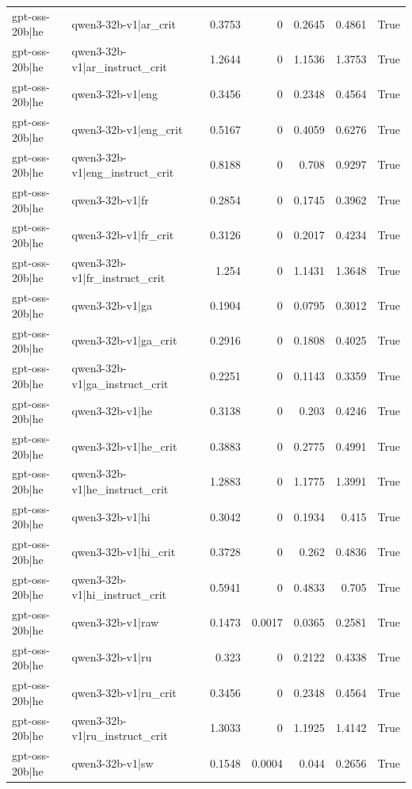 \begin{table}
\begin{tabular}{l l r r r r l}
gpt-oss-20b|he & qwen3-32b-v1|ar_crit & 0.3753 & 0 & 0.2645 & 0.4861 & True \\
gpt-oss-20b|he & qwen3-32b-v1|ar_instruct_crit & 1.2644 & 0 & 1.1536 & 1.3753 & True \\
gpt-oss-20b|he & qwen3-32b-v1|eng & 0.3456 & 0 & 0.2348 & 0.4564 & True \\
gpt-oss-20b|he & qwen3-32b-v1|eng_crit & 0.5167 & 0 & 0.4059 & 0.6276 & True \\
gpt-oss-20b|he & qwen3-32b-v1|eng_instruct_crit & 0.8188 & 0 & 0.708 & 0.9297 & True \\
gpt-oss-20b|he & qwen3-32b-v1|fr & 0.2854 & 0 & 0.1745 & 0.3962 & True \\
gpt-oss-20b|he & qwen3-32b-v1|fr_crit & 0.3126 & 0 & 0.2017 & 0.4234 & True \\
gpt-oss-20b|he & qwen3-32b-v1|fr_instruct_crit & 1.254 & 0 & 1.1431 & 1.3648 & True \\
gpt-oss-20b|he & qwen3-32b-v1|ga & 0.1904 & 0 & 0.0795 & 0.3012 & True \\
gpt-oss-20b|he & qwen3-32b-v1|ga_crit & 0.2916 & 0 & 0.1808 & 0.4025 & True \\
gpt-oss-20b|he & qwen3-32b-v1|ga_instruct_crit & 0.2251 & 0 & 0.1143 & 0.3359 & True \\
gpt-oss-20b|he & qwen3-32b-v1|he & 0.3138 & 0 & 0.203 & 0.4246 & True \\
gpt-oss-20b|he & qwen3-32b-v1|he_crit & 0.3883 & 0 & 0.2775 & 0.4991 & True \\
gpt-oss-20b|he & qwen3-32b-v1|he_instruct_crit & 1.2883 & 0 & 1.1775 & 1.3991 & True \\
gpt-oss-20b|he & qwen3-32b-v1|hi & 0.3042 & 0 & 0.1934 & 0.415 & True \\
gpt-oss-20b|he & qwen3-32b-v1|hi_crit & 0.3728 & 0 & 0.262 & 0.4836 & True \\
gpt-oss-20b|he & qwen3-32b-v1|hi_instruct_crit & 0.5941 & 0 & 0.4833 & 0.705 & True \\
gpt-oss-20b|he & qwen3-32b-v1|raw & 0.1473 & 0.0017 & 0.0365 & 0.2581 & True \\
gpt-oss-20b|he & qwen3-32b-v1|ru & 0.323 & 0 & 0.2122 & 0.4338 & True \\
gpt-oss-20b|he & qwen3-32b-v1|ru_crit & 0.3456 & 0 & 0.2348 & 0.4564 & True \\
gpt-oss-20b|he & qwen3-32b-v1|ru_instruct_crit & 1.3033 & 0 & 1.1925 & 1.4142 & True \\
gpt-oss-20b|he & qwen3-32b-v1|sw & 0.1548 & 0.0004 & 0.044 & 0.2656 & True \\

\end{tabular}
\end{table}

